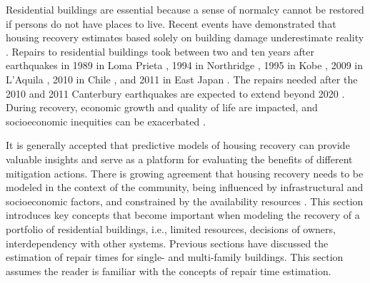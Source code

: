 Residential buildings are essential because a sense of normalcy cannot be restored if persons do not have places to live. Recent events have demonstrated that housing recovery estimates based solely on building damage underestimate reality \citep{comerio2006estimating}. Repairs to residential buildings took between two and ten years after earthquakes in 1989 in Loma Prieta \citep{comerio2006estimating}, 1994 in Northridge \citep{Olshansky2006}, 1995 in Kobe \citep{comerio2014disaster, Olshansky2006}, 2009 in L'Aquila \citep{di2017reconstruction1, di2017reconstruction2}, 2010 in Chile \citep{comerio2013housing}, and 2011 in East Japan \citep{ranghieri2014learning}. The repairs needed after the 2010 and 2011 Canterbury earthquakes are expected to extend beyond 2020 \citep{BankOfNZ2016}. During recovery, economic growth and quality of life are impacted, and socioeconomic inequities can be exacerbated \citep{peacock2014inequities, wang2015influencing, bolin1985disasters}.\

It is generally accepted that predictive models of housing recovery can provide valuable insights and serve as a platform for evaluating the benefits of different mitigation actions. There is growing agreement that housing recovery needs to be modeled in the context of the community, being influenced by infrastructural and socioeconomic factors, and constrained by the availability resources \citep{lee2019quantitative, masoomi2018community, ellingwood2018performance, bilau2018practice, Sutley2017a, davidson2015integrating}. This section introduces key concepts that become important when modeling the recovery of a portfolio of residential buildings, i.e., limited resources, decisions of owners, interdependency with other systems. Previous sections have discussed the estimation of repair times for single- and multi-family buildings. This section assumes the reader is familiar with the concepts of repair time estimation. \ 


